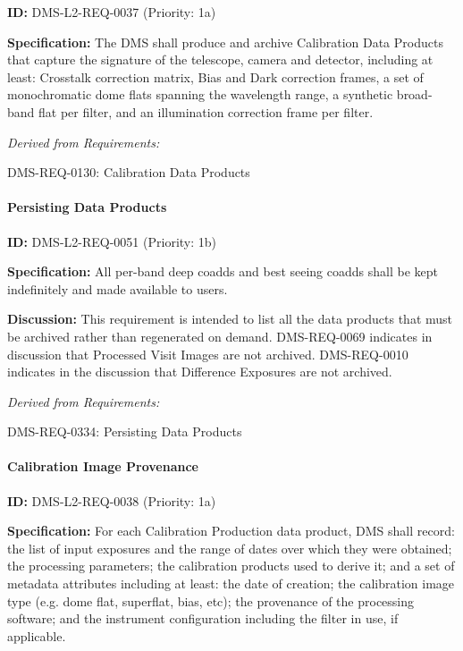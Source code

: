 \documentclass[SE,toc,lsstdraft]{lsstdoc}
\begin{document}
\label{DMS-L2-REQ-0037}
\textbf{ID:} DMS-L2-REQ-0037 (Priority: 1a)

\textbf{Specification:} The DMS shall produce and archive Calibration Data Products that capture the signature of the telescope, camera and detector, including at least: Crosstalk correction matrix, Bias and Dark correction frames, a set of monochromatic dome flats spanning the wavelength range, a synthetic broad-band flat per filter, and an illumination correction frame per filter.

\emph{Derived from Requirements:}

DMS-REQ-0130:
Calibration Data Products \newline

\paragraph{Persisting Data Products}\hfill  %

\label{DMS-L2-REQ-0051}
\textbf{ID:} DMS-L2-REQ-0051 (Priority: 1b)

\textbf{Specification:}
All per-band deep coadds and best seeing coadds shall be kept indefinitely and made available to users.

\textbf{Discussion:} This requirement is intended to list all the data products that must be archived rather than regenerated on demand. DMS-REQ-0069 indicates in discussion that Processed Visit Images are not archived. DMS-REQ-0010 indicates in the discussion that Difference Exposures are not archived.

\emph{Derived from Requirements:}

DMS-REQ-0334:
Persisting Data Products \newline

\paragraph{Calibration Image Provenance}\hfill  %

\label{DMS-L2-REQ-0038}
\textbf{ID:} DMS-L2-REQ-0038 (Priority: 1a)

\textbf{Specification:} For each Calibration Production data product, DMS shall record: the list of input exposures and the range of dates over which they were obtained; the processing parameters; the calibration products used to derive it; and a set of metadata attributes including at least: the date of creation; the calibration image type (e.g. dome flat, superflat, bias, etc); the provenance of the processing software; and the instrument configuration including the filter in use, if applicable.
\end{document}
